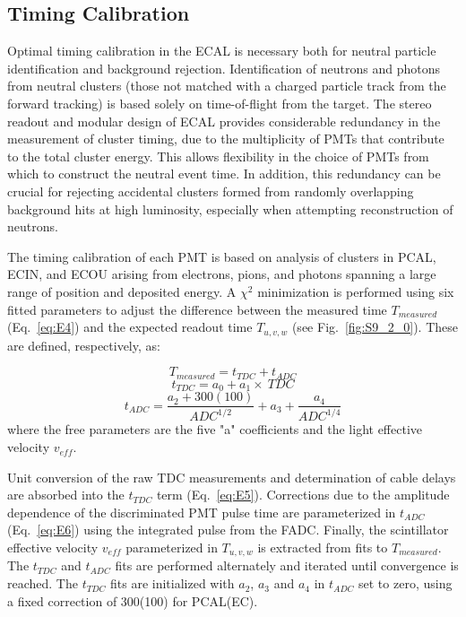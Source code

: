\subsection{Timing Calibration}

Optimal timing calibration in the ECAL is necessary both for neutral particle identification and background rejection.
Identification of neutrons and photons from neutral clusters (those not matched with a charged particle track from
the forward tracking) is based solely on time-of-flight from the target. The stereo readout and modular design of ECAL provides
considerable redundancy in the measurement of cluster timing, due to the multiplicity of PMTs that contribute to the
total cluster energy. This allows flexibility in the choice of PMTs from which to construct the neutral event time. In
addition, this redundancy can be crucial for rejecting accidental clusters formed from randomly overlapping
background hits at high luminosity, especially when attempting reconstruction of neutrons. 

The timing calibration of each PMT is based on analysis of clusters in PCAL, ECIN, and ECOU arising from electrons,
pions, and photons spanning a large range of position and deposited energy. A $\chi^2$ minimization is performed
using six fitted parameters to adjust the difference between the measured time $T_{measured}$ (Eq.~\ref{eq:E4})
and the expected readout time $T_{u,v,w}$ (see Fig.~\ref{fig:S9_2_0}). These are defined, respectively, as:

\begin{equation}
T_{measured}=t_{TDC}+t_{ADC} \label{eq:E4}
\end{equation}
\begin{equation}
t_{TDC}=a_0+a_1\times~TDC \label{eq:E5}
\end{equation}
\begin{equation}
t_{ADC}=\frac{a_2+300(100)}{ADC^{1/2}}+a_3+\frac{a_4}{ADC^{1/4}} \label{eq:E6}
\end{equation}
where the free parameters are the five "a" coefficients and the light effective velocity $v_{eff}$.

Unit conversion of the raw TDC measurements and determination of cable delays are absorbed into the $t_{TDC}$ term (Eq.~\ref{eq:E5}). Corrections due to the
amplitude dependence of the discriminated PMT pulse time are parameterized in $t_{ADC}$ (Eq.~\ref{eq:E6}) using
the integrated pulse from the FADC.  Finally, the scintillator effective velocity $v_{eff}$ parameterized in $T_{u,v,w}$
is extracted from fits to $T_{measured}$. The $t_{TDC}$ and $t_{ADC}$ fits are performed alternately and iterated
until convergence is reached. The $t_{TDC}$ fits are initialized with $a_2$, $a_3$ and $a_4$ in $t_{ADC}$ set to zero,
using a fixed correction of 300(100) for PCAL(EC).

